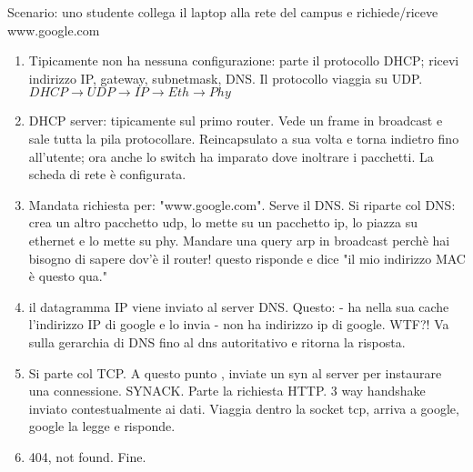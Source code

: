 Scenario: uno studente collega il laptop alla rete del campus e richiede/riceve www.google.com
\begin{enumerate}
	\item Tipicamente non ha nessuna configurazione: parte il protocollo DHCP; ricevi indirizzo IP, gateway, subnetmask, DNS. Il protocollo viaggia su UDP.\\
	$ DHCP \rightarrow UDP \rightarrow IP \rightarrow Eth \rightarrow Phy $
	
	\item DHCP server: tipicamente sul primo router. Vede un frame in broadcast e sale tutta la pila protocollare.
	Reincapsulato a sua volta e torna indietro fino all'utente; ora anche lo switch ha imparato dove inoltrare i pacchetti. La scheda di rete è configurata.
	
	\item Mandata richiesta per: "www.google.com". Serve il DNS.
	Si riparte col DNS: crea un altro pacchetto udp, lo mette su un pacchetto ip, lo piazza su ethernet e lo mette su phy.
	Mandare una query arp in broadcast perchè hai bisogno di sapere dov'è il router! questo risponde e dice "il mio indirizzo MAC è questo qua."
	
	\item il datagramma IP viene inviato al server DNS. Questo:
		- ha nella sua cache l'indirizzo IP di google e lo invia
		- non ha indirizzo ip di google. WTF?! Va sulla gerarchia di DNS fino al dns autoritativo e ritorna la risposta.
	
	\item Si parte col TCP.	A questo punto , inviate un syn al server per instaurare una connessione. SYNACK. Parte la richiesta HTTP. 3 way handshake inviato contestualmente ai dati.
	Viaggia dentro la socket tcp, arriva a google, google la legge e risponde. 
	
	\item 404, not found.
	Fine.
\end{enumerate}